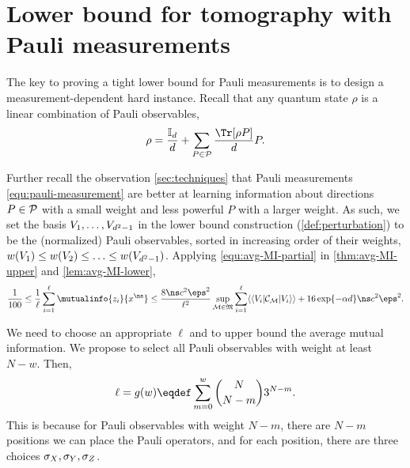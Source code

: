 \section{Lower bound for tomography with Pauli measurements}
The key to proving a tight lower bound for Pauli measurements is to design a measurement-dependent hard instance. Recall that any quantum state $\rho$ is a linear combination of Pauli observables,
\[
\rho=\frac{\eye_\dims}{\dims}+\sum_{P\in\pauliObsSet}\frac{\Tr[\rho P]}{\dims}P.
\]

Further recall the observation \cref{sec:techniques} that Pauli measurements \eqref{equ:pauli-measurement} are better at learning information about directions 
$P\in {\mathcal{P}}$ with a small weight and less powerful $P$ with a larger weight. 
As such, we set the basis $V_1, \ldots, V_{d^2-1}$ in the lower bound construction (\cref{def:perturbation}) to be the (normalized) Pauli observables, sorted in increasing order of their weights, $w(V_1)\le w(V_2)\le \ldots \le w(V_{d^2-1})$. Applying \eqref{equ:avg-MI-partial} in \cref{thm:avg-MI-upper} and \cref{lem:avg-MI-lower},
\begin{equation}
    \frac{1}{100}\le \frac{1}{\ell}\sum_{i=1}^{\ell}\mutualinfo{\ptb_i}{\out^\ns}\le \frac{8 \ns c^2 \eps^2}{\ell^2} \sup_{\POVM\in\povmset}\sum_{i=1}^{\ell} \vadj{V_i}\Choi_{\POVM} \vvec{V_i} +16\exp\{-\alpha\dims\}\ns c^2\eps^2.
    \label{equ:pauli-lower-inequ}
\end{equation}


We need to choose an appropriate $\ell$ and to upper bound the average mutual information. We propose to select all Pauli observables with weight at least $N-w$. Then,
\begin{equation}
    \ell = g(w)\eqdef \sum_{m=0}^w{\nqubits \choose N-m}3^{N-m}.
    \label{equ:pauli-weight-number}
\end{equation}
This is because for Pauli observables with weight $N-m$, there are $N-m$ positions we can place the Pauli operators, and for each position, there are three choices ${\sigma_X}, {\sigma_Y}, {\sigma_Z}$.



